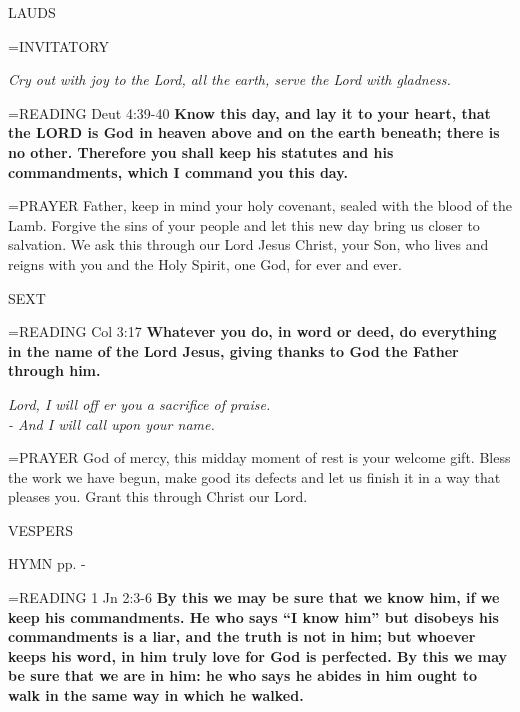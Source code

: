 \begin{flushleft}\normalsize LAUDS\\\end{flushleft}

\hangindent=\parindent \small{INVITATORY}
\begin{center}
\textit{Cry out with joy to the Lord, all the earth, serve the Lord with gladness.\\}
\end{center}

\hangindent=\parindent \small{READING} Deut 4:39-40 \textbf{Know this day, and lay it to your heart, that the LORD is God in heaven above and on the earth beneath; there is no other. Therefore you shall keep his statutes and his commandments, which I command you this day.\\}

\hangindent=\parindent \small{PRAYER  Father, keep in mind your holy covenant, sealed with the blood of the Lamb. Forgive the sins of your people and let this new day bring us closer to salvation. We ask this through our Lord Jesus Christ, your Son, who lives and reigns with you and the Holy Spirit, one God, for ever and ever.}

\begin{flushleft}\normalsize SEXT\\\end{flushleft}

\hangindent=\parindent \small{READING} Col 3:17 \textbf{Whatever you do, in word or deed, do everything in the name of the Lord Jesus, giving thanks to God the Father through him.}

\begin{center}
\textit{Lord, I will off er you a sacrifice of praise.\\
- And I will call upon your name.}
\end{center}

\hangindent=\parindent \small{PRAYER  God of mercy, this midday moment of rest is your welcome gift. Bless the work we have begun, make good its defects and let us finish it in a way that pleases you. Grant this through Christ our Lord.}

\begin{flushleft}\normalsize VESPERS\\\end{flushleft}

HYMN pp. \pageref{ordinaryTime:fourthHymn} - \pageref{ordinaryTime:sixthHymn}

\hangindent=\parindent \small{READING} 1 Jn 2:3-6 \textbf{By this we may be sure that we know him, if we keep his commandments. He who says “I know him” but disobeys his commandments is a liar, and the truth is not in him; but whoever keeps his word, in him truly love for God is perfected. By this we may be sure that we are in him: he who says he abides in him ought to walk in the same way in which he walked.\\}


